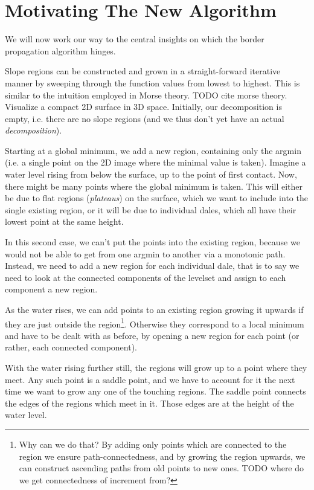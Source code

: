 \documentclass[a4paper,12pt]{paper}
\theoremstyle{plain}
\theoremstyle{definition}
\begin{document}
\section{Motivating The New Algorithm}
We will now work our way to the central insights on which the border propagation algorithm hinges.

Slope regions can be constructed and grown in a straight-forward iterative manner by sweeping through the function values from lowest to highest. This is similar to the intuition employed in Morse theory. TODO cite morse theory. Visualize a compact 2D surface in 3D space. Initially, our decomposition is empty, i.e. there are no slope regions (and we thus don't yet have an actual \emph{decomposition}).

Starting at a global minimum, we add a new region, containing only the argmin (i.e. a single point on the 2D image where the minimal value is taken). Imagine a water level rising from below the surface, up to the point of first contact. Now, there might be many points where the global minimum is taken. This will either be due to flat regions (\emph{plateaus}) on the surface, which we want to include into the single existing region, or it will be due to individual dales, which all have their lowest point at the same height.

In this second case, we can't put the points into the existing region, because we would not be able to get from one argmin to another via a monotonic path. Instead, we need to add a new region for each individual dale, that is to say we need to look at the connected components of the levelset and assign to each component a new region.

As the water rises, we can add points to an existing region growing it upwards if they are just outside the region\footnote{Why can we do that? By adding only points which are connected to the region we ensure path-connectedness, and by growing the region upwards, we can construct ascending paths from old points to new ones. TODO where do we get connectedness of increment from?}. Otherwise they correspond to a local minimum and have to be dealt with as before, by opening a new region for each point (or rather, each connected component).

With the water rising further still, the regions will grow up to a point where they meet. Any such point is a saddle point, and we have to account for it the next time we want to grow any one of the touching regions. The saddle point connects the edges of the regions which meet in it. Those edges are at the height of the water level.
\end{document}
